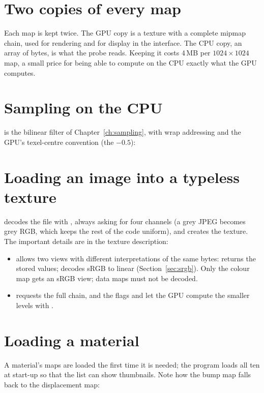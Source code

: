 \section{Two copies of every map}
Each map is kept twice. The GPU copy is a texture with a complete mipmap chain, used for
rendering and for display in the interface. The CPU copy, an array of bytes, is what the probe
reads. Keeping it costs 4\,MB per $1024\times1024$ map, a small price for being able to compute
on the CPU exactly what the GPU computes.


\section{Sampling on the CPU}
\label{sec:cpusampling}
 is the bilinear filter of Chapter~\ref{ch:sampling}, with wrap
addressing and the GPU's texel-centre convention (the $-0.5$):


\section{Loading an image into a typeless texture}
\label{sec:typeless}
 decodes the file with , always asking for four channels (a grey
JPEG becomes grey RGB, which keeps the rest of the code uniform), and creates the texture. The
important details are in the texture description:
\begin{itemize}
\item {} allows two views with different interpretations of
the same bytes:  returns the stored values;  decodes sRGB to linear
(Section~\ref{sec:srgb}). Only the colour map gets an sRGB view; data maps must not be decoded.
\item {} requests the full chain, and the flags  and
 let the GPU compute the smaller levels with .
\end{itemize}


\section{Loading a material}
A material's maps are loaded the first time it is needed; the program loads all ten at start-up
so that the list can show thumbnails. Note how the bump map falls back to the displacement map:

